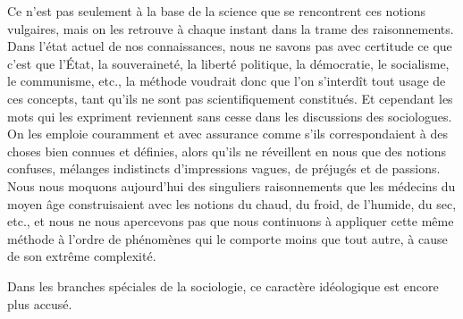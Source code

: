 \documentclass[french,twoside]{book} %
\begin{document}
Ce n’est pas seulement à la base de la science que se rencontrent ces notions vulgaires, mais on les retrouve à chaque instant dans la trame des raisonnements. Dans l’état actuel de nos connaissances, nous ne savons pas avec certitude ce que c’est que l’État, la souveraineté, la liberté politique, la démocratie, le socialisme, le communisme, etc., la méthode voudrait donc que l’on s’interdît tout usage de ces concepts, tant qu’ils ne sont pas scientifiquement constitués. Et cependant les mots qui les expriment reviennent sans cesse dans les discussions des sociologues. On les emploie couramment et avec assurance comme s’ils correspondaient à des choses bien connues et définies, alors qu’ils ne réveillent en nous que des notions confuses, mélanges indistincts d’impressions vagues, de préjugés et de passions. Nous nous moquons aujourd’hui des singuliers raisonnements que les médecins du moyen âge construisaient avec les notions du chaud, du froid, de l’humide, du sec, etc., et nous ne nous apercevons pas que nous continuons à appliquer cette même méthode à l’ordre de phénomènes qui le comporte moins que tout autre, à cause de son extrême complexité.\par
Dans les branches spéciales de la sociologie, ce caractère idéologique est encore plus accusé.\par
\end{document}
